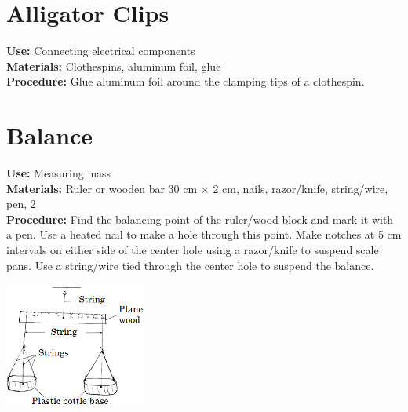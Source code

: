 \begin{multicols}{2}

\section{Alligator Clips} 
\label{sec:alligator-clips}
\vspace{-10pt}
\textbf{Use:} Connecting electrical components\\
\textbf{Materials:} Clothespins, aluminum foil, glue\\
\textbf{Procedure:} Glue aluminum foil around the clamping tips of a clothespin.

\section{Balance} 
\label{sec:balance}
\vspace{-10pt}
\textbf{Use:} Measuring mass\\
\textbf{Materials:} Ruler or wooden bar 30 cm $\times$ 2 cm, nails, razor/knife, string/wire, pen, 2 \\
\textbf{Procedure:} Find the balancing point of the ruler/wood block and mark it with a pen. Use a heated nail to make a hole through this point. Make notches at 5 cm intervals on either side of the center hole using a razor/knife to suspend scale pans. Use a string/wire tied through the center hole to suspend the balance.
\begin{center}
\includegraphics[width=0.35\textwidth]{./img/beam-balance-2.png}
\end{center}


\end{multicols}
